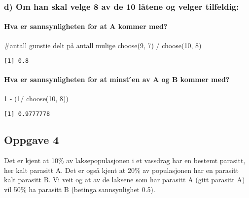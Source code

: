 \documentclass[
  12pt,
  a4paper,
  DIV=11,
  numbers=noendperiod]{scrartcl}
\let\oldparagraph\paragraph
\renewcommand{\paragraph}[1]{\oldparagraph{#1}\mbox{}}
\newenvironment{Shaded}{\begin{snugshade}}{\end{snugshade}}
\newcommand{\CommentTok}[1]{\textcolor[rgb]{0.37,0.37,0.37}{#1}}
\newcommand{\DecValTok}[1]{\textcolor[rgb]{0.68,0.00,0.00}{#1}}
\newcommand{\FunctionTok}[1]{\textcolor[rgb]{0.28,0.35,0.67}{#1}}
\newcommand{\NormalTok}[1]{\textcolor[rgb]{0.00,0.23,0.31}{#1}}
\newcommand{\SpecialCharTok}[1]{\textcolor[rgb]{0.37,0.37,0.37}{#1}}
\begin{document}
\subsubsection{d) Om han skal velge 8 av de 10 låtene og velger
tilfeldig:}\label{d-om-han-skal-velge-8-av-de-10-luxe5tene-og-velger-tilfeldig}

\paragraph{Hva er sannsynligheten for at A kommer
med?}\label{hva-er-sannsynligheten-for-at-a-kommer-med}

\begin{Shaded}
\begin{Highlighting}[]
\CommentTok{\#antall gunstie delt på antall mulige}
\FunctionTok{choose}\NormalTok{(}\DecValTok{9}\NormalTok{, }\DecValTok{7}\NormalTok{) }\SpecialCharTok{/} \FunctionTok{choose}\NormalTok{(}\DecValTok{10}\NormalTok{, }\DecValTok{8}\NormalTok{)}
\end{Highlighting}
\end{Shaded}

\begin{verbatim}
[1] 0.8
\end{verbatim}

\paragraph{Hva er sannsynligheten for at minst ́en av A og B kommer
med?}\label{hva-er-sannsynligheten-for-at-minst-en-av-a-og-b-kommer-med}

\begin{Shaded}
\begin{Highlighting}[]
\DecValTok{1} \SpecialCharTok{{-}}\NormalTok{ (}\DecValTok{1}\SpecialCharTok{/} \FunctionTok{choose}\NormalTok{(}\DecValTok{10}\NormalTok{, }\DecValTok{8}\NormalTok{))}
\end{Highlighting}
\end{Shaded}

\begin{verbatim}
[1] 0.9777778
\end{verbatim}

\subsection{Oppgave 4}\label{oppgave-4}

Det er kjent at 10\% av laksepopulasjonen i et vassdrag har en bestemt
parasitt, her kalt parasitt A. Det er også kjent at 20\% av populasjonen
har en parasitt kalt parasitt B. Vi veit og at av de laksene som har
parasitt A (gitt parasitt A) vil 50\% ha parasitt B (betinga
sannsynlighet 0.5).
\end{document}
